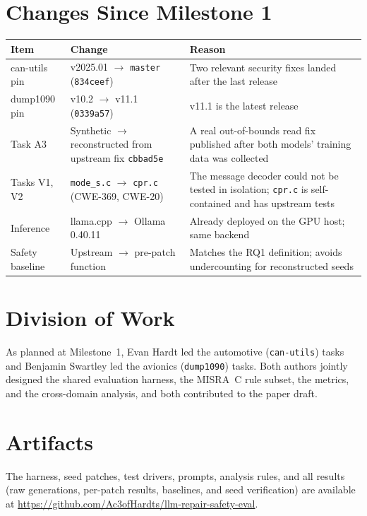 \documentclass[12pt]{article}
\newcommand{\repourl}{\url{https://github.com/Ac3ofHardts/llm-repair-safety-eval}}
\begin{document}
\section{Changes Since Milestone 1}
\begin{table}[H]
    \centering
    \small
    \begin{tabularx}{\linewidth}{@{}l X X@{}}
        \toprule
        \textbf{Item} & \textbf{Change} & \textbf{Reason} \\
        \midrule
        can-utils pin & v2025.01 $\rightarrow$ \texttt{master} (\texttt{834ceef}) & Two relevant security fixes landed after the last release \\
        dump1090 pin & v10.2 $\rightarrow$ v11.1 (\texttt{0339a57}) & v11.1 is the latest release \\
        Task A3 & Synthetic $\rightarrow$ reconstructed from upstream fix \texttt{cbbad5e} & A real out-of-bounds read fix published after both models' training data was collected \\
        Tasks V1, V2 & \texttt{mode\_s.c} $\rightarrow$ \texttt{cpr.c} (CWE-369, CWE-20) & The message decoder could not be tested in isolation; \texttt{cpr.c} is self-contained and has upstream tests \\
        Inference & llama.cpp $\rightarrow$ Ollama 0.40.11 & Already deployed on the GPU host; same backend \\
        Safety baseline & Upstream $\rightarrow$ pre-patch function & Matches the RQ1 definition; avoids undercounting for reconstructed seeds \\
        \bottomrule
    \end{tabularx}
\end{table}

\section{Division of Work}
As planned at Milestone~1, Evan Hardt led the automotive (\texttt{can-utils}) tasks and Benjamin Swartley led the avionics (\texttt{dump1090}) tasks. Both authors jointly designed the shared evaluation harness, the MISRA~C rule subset, the metrics, and the cross-domain analysis, and both contributed to the paper draft.

\section{Artifacts}
The harness, seed patches, test drivers, prompts, analysis rules, and all results (raw generations, per-patch results, baselines, and seed verification) are available at \repourl.
\end{document}

